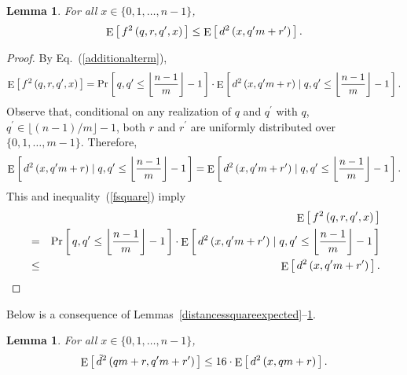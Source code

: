 \documentclass[letterpaper,12pt]{article}
\newtheorem{lemma}[theorem]{Lemma}
\begin{document}
{{\begin{lemma}\label{fsquarelemma}
For all $x\in\{0,1,\ldots,n-1\}$,
\begin{eqnarray*}
\mathop{\rm E}\left[\,f^2\left(q,r,q^\prime,x\right)\,\right]
\le \mathop{\rm E}\left[\,d^2\left(x,q^\prime m+r^\prime\right)\,\right].
\end{eqnarray*}
\end{lemma}
\begin{proof}
By Eq.~(\ref{additionalterm}),
{\small \begin{eqnarray}
\mathop{\rm E}\left[\,f^2\left(q,r,q^\prime,x\right)\,\right]
=
\Pr\left[\,q,q^\prime\le \left\lfloor\frac{n-1}{m}\right\rfloor-1\,\right]
\cdot
\mathop{\rm E}\left[\,d^2\left(x,q^\prime m+r\right)\mid q,q^\prime\le
\left\lfloor\frac{n-1}{m}\right\rfloor-1\,\right].
\label{fsquare}
\end{eqnarray}
}Observe that,
conditional on any realization
of $q$ and $q^\prime$ with $q$, $q^\prime\in \lfloor(n-1)/m\rfloor-1$,
both $r$ and $r^\prime$ are uniformly distributed over $\{0,1,\ldots,m-1\}$.
Therefore,
{\small \begin{eqnarray*}
\mathop{\rm E}\left[\,d^2\left(x,q^\prime m+r\right)\mid q,q^\prime\le
\left\lfloor\frac{n-1}{m}\right\rfloor-1\,\right]
=
\mathop{\rm E}\left[\,d^2\left(x,q^\prime m+r^\prime\right)\mid q,q^\prime\le
\left\lfloor\frac{n-1}{m}\right\rfloor-1\,\right].
\end{eqnarray*}
}This and inequality~(\ref{fsquare})
imply
\begin{eqnarray*}
&&\mathop{\rm E}\left[\,f^2\left(q,r,q^\prime,x\right)\,\right]\nonumber\\
&=&
\Pr\left[\,q,q^\prime\le \left\lfloor\frac{n-1}{m}\right\rfloor-1\,\right]
\cdot
\mathop{\rm E}\left[\,d^2\left(x,q^\prime m+r^\prime\right)\mid q,q^\prime\le
\left\lfloor\frac{n-1}{m}\right\rfloor-1\,\right]\\
&\le& \mathop{\rm E}\left[\,d^2\left(x,q^\prime m+r^\prime\right)\,\right].
\end{eqnarray*}
\end{proof}


Below is a consequence of
Lemmas~\ref{distancessquareexpected}--\ref{fsquarelemma}.

\begin{lemma}\label{therecomestheratioof16}
For all $x\in\{0,1,\ldots,n-1\}$,
\begin{eqnarray*}
\mathop{\rm E}\left[\,{\tilde{d}}^2\left(qm+r,q^\prime m+r^\prime\right)\,\right]
\le 16\cdot \mathop{\rm E}\left[\,d^2\left(x,qm+r\right)\,\right].
\end{eqnarray*}
\end{lemma}

}}
\end{document}
